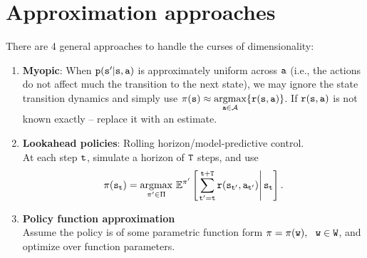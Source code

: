 \section{Approximation approaches}
There are 4 general approaches to handle the curses of dimensionality:
\begin{enumerate}
\item \textbf{Myopic}: When ${\tt p}({\tt s}'|{\tt s},{\tt a})$ is approximately uniform across ${\tt a}$ (i.e., the actions do not affect much the transition to the next state), we may ignore the state transition dynamics and simply use $\pi({\tt s})\approx \underset{{\tt a} \in \mathcal{A}}{\operatorname{argmax}} \{{\tt r}({\tt s},{\tt a})\}$. If ${\tt r}({\tt s},{\tt a})$ is not known exactly -- replace it with an estimate.

\item \textbf{Lookahead policies}: Rolling horizon/model-predictive control.\\
At each step ${\tt t}$, simulate a horizon of ${\tt T}$ steps, and use
$$\pi({\tt s}_{\tt t}) = \underset{\pi' \in \Pi}{\operatorname{argmax}}\  \mathbb{E}^{\pi'} \left[\left.\sum_{{\tt t}'={\tt t}}^{{\tt t}+{\tt T}} {\tt r}({\tt s}_{{\tt t}'},{\tt a}_{{\tt t}'})\right|{\tt s}_{\tt t}\right].$$

\item \textbf{Policy function approximation}\\
Assume the policy is of some parametric function form $\pi = \pi({\tt w}), \ \ {\tt w} \in \mathtt{W}$, and optimize over function parameters.\\



\end{enumerate}
